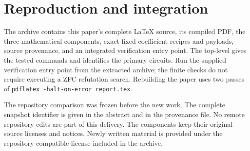 \documentclass[11pt,a4paper]{article}
\theoremstyle{definition}\newtheorem{definition}[theorem]{Definition}
\theoremstyle{remark}\newtheorem{remark}[theorem]{Remark}
\begin{document}
\section{Reproduction and integration}
\label{sec:reproduction}
The archive contains this paper's complete LaTeX source, its compiled PDF,
the three mathematical components, exact fixed-coefficient recipes and
payloads, source provenance, and an integrated verification entry point.
The top-level  gives the tested commands and identifies
the primary circuits. Run the supplied verification entry point from the
extracted archive; the finite checks do not require executing a ZFC
refutation search. Rebuilding the paper uses two passes of
\texttt{pdflatex -halt-on-error report.tex}.

The repository comparison was frozen before the new work. The complete
snapshot identifier is given in the abstract and in the provenance file.
No remote repository edits are part of this delivery. The components keep
their original source licenses and notices. Newly written material is
provided under the repository-compatible license included in the archive.
\end{document}
